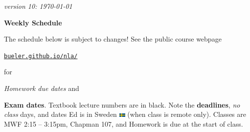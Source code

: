 \documentclass[12pt]{article}
\newcommand{\vacinline}[1]{{\color{OliveGreen} \textsl{#1}}}
\newcommand{\due}[1]{\strut {\color{BrickRed} \textsl{#1}}}
\newcommand{\ee}[1]{\strut {\color{Blue} \textbf{#1}}}
\newcommand{\dlinline}[1]{{\color{Purple} \textbf{#1}}}
\begin{document}
\hfill \small \emph{version 10: \today} \normalsize

\bigskip\bigskip
\centerline{\Large \textbf{Weekly Schedule}}

\bigskip
The schedule below is subject to changes!  See the public course webpage

\medskip

\centerline{\href{https://bueler.github.io/nla/index.html}{\texttt{bueler.github.io/nla/}}}

\noindent for \due{Homework due dates} and \ee{Exam dates}.  Textbook lecture numbers are in black.  Note the \dlinline{deadlines}, \vacinline{no class} days, and dates Ed is in Sweden \includegraphics[width=12px]{sweden.png} (when class is remote only).  Classes are MWF 2:15 -- 3:15pm, Chapman 107, and Homework is due at the start of class.

\bigskip
\end{document}
